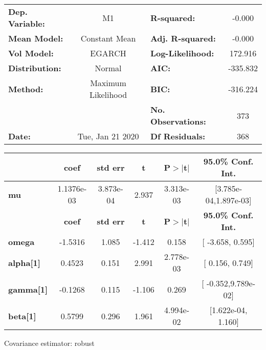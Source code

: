 \begin{center}
\begin{tabular}{lclc}
\toprule
\textbf{Dep. Variable:} &         M1         & \textbf{  R-squared:         } &    -0.000   \\
\textbf{Mean Model:}    &   Constant Mean    & \textbf{  Adj. R-squared:    } &    -0.000   \\
\textbf{Vol Model:}     &       EGARCH       & \textbf{  Log-Likelihood:    } &    172.916  \\
\textbf{Distribution:}  &       Normal       & \textbf{  AIC:               } &   -335.832  \\
\textbf{Method:}        & Maximum Likelihood & \textbf{  BIC:               } &   -316.224  \\
\textbf{}               &                    & \textbf{  No. Observations:  } &    373      \\
\textbf{Date:}          &  Tue, Jan 21 2020  & \textbf{  Df Residuals:      } &    368      \\
\bottomrule
\end{tabular}
\begin{tabular}{lccccc}
            & \textbf{coef} & \textbf{std err} & \textbf{t} & \textbf{P$>$$|$t$|$} & \textbf{95.0\% Conf. Int.}  \\
\midrule
\textbf{mu} &   1.1376e-03  &    3.873e-04     &     2.937  &      3.313e-03       &   [3.785e-04,1.897e-03]     \\
                  & \textbf{coef} & \textbf{std err} & \textbf{t} & \textbf{P$>$$|$t$|$} & \textbf{95.0\% Conf. Int.}  \\
\midrule
\textbf{omega}    &      -1.5316  &        1.085     &    -1.412  &          0.158       &     [ -3.658,  0.595]       \\
\textbf{alpha[1]} &       0.4523  &        0.151     &     2.991  &      2.778e-03       &     [  0.156,  0.749]       \\
\textbf{gamma[1]} &      -0.1268  &        0.115     &    -1.106  &          0.269       &    [ -0.352,9.789e-02]      \\
\textbf{beta[1]}  &       0.5799  &        0.296     &     1.961  &      4.994e-02       &    [1.622e-04,  1.160]      \\
\bottomrule
\end{tabular}
\end{center}

Covariance estimator: robust